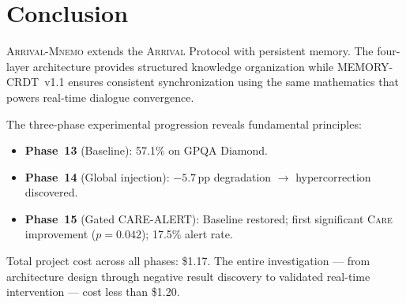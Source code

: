 \documentclass[11pt,a4paper]{article}
\newcommand{\arrival}{\textsc{Arrival}\xspace}
\newcommand{\mnemo}{\textsc{Arrival-Mnemo}\xspace}
\newcommand{\care}{\textsc{Care}\xspace}
\newcommand{\pp}{\,pp\xspace}
\begin{document}
\section{Conclusion}\label{sec:conclusion}

\mnemo extends the \arrival Protocol with persistent memory.  The
four-layer architecture provides structured knowledge organization
while MEMORY-CRDT~v1.1 ensures consistent synchronization using the
same mathematics that powers real-time dialogue convergence.

The three-phase experimental progression reveals fundamental principles:
\begin{itemize}
  \item \textbf{Phase~13} (Baseline): 57.1\% on GPQA Diamond.
  \item \textbf{Phase~14} (Global injection): $-5.7$\pp degradation
    $\to$ hypercorrection discovered.
  \item \textbf{Phase~15} (Gated CARE-ALERT): Baseline restored;
    first significant \care improvement ($p = 0.042$); 17.5\% alert
    rate.
\end{itemize}

Total project cost across all phases: \$1.17.  The entire investigation
--- from architecture design through negative result discovery to
validated real-time intervention --- cost less than \$1.20.

\end{document}
